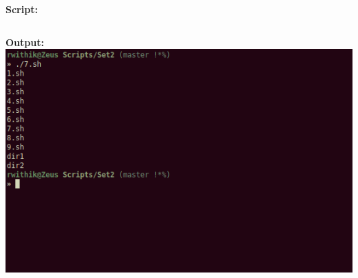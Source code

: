 \documentclass[10pt,a4paper,titlepage]{report}
\begin{document}
\begin{enumerate}
\begin{enumerate}
\end{enumerate}
\newline
\textbf{Script:}\newline
\inputminted{bash}{../Scripts/Set2/7.sh}
\newline
\textbf{Output:}\newline
\includegraphics[width=\linewidth]{../Images/Shell2/7.png}
\pagebreak


\end{enumerate}
\end{document}
